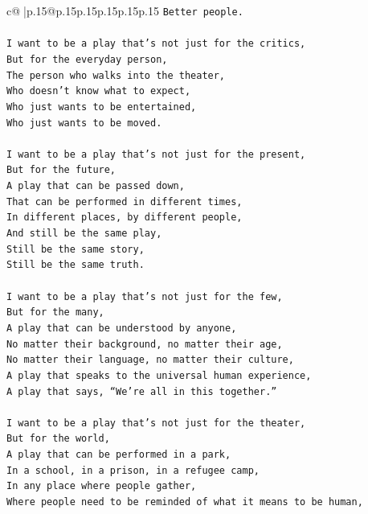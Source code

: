 \documentclass{article}
\begin{document}
{\begin{supertabular}{c@{$\;$}|p{.15\linewidth}@{}p{.15\linewidth}p{.15\linewidth}p{.15\linewidth}p{.15\linewidth}p{.15\linewidth}}
{{{\texttt{Better people.} \\
\\ 
\texttt{I want to be a play that’s not just for the critics,} \\
\texttt{But for the everyday person,} \\
\texttt{The person who walks into the theater,} \\
\texttt{Who doesn’t know what to expect,} \\
\texttt{Who just wants to be entertained,} \\
\texttt{Who just wants to be moved.} \\
\\ 
\texttt{I want to be a play that’s not just for the present,} \\
\texttt{But for the future,} \\
\texttt{A play that can be passed down,} \\
\texttt{That can be performed in different times,} \\
\texttt{In different places, by different people,} \\
\texttt{And still be the same play,} \\
\texttt{Still be the same story,} \\
\texttt{Still be the same truth.} \\
\\ 
\texttt{I want to be a play that’s not just for the few,} \\
\texttt{But for the many,} \\
\texttt{A play that can be understood by anyone,} \\
\texttt{No matter their background, no matter their age,} \\
\texttt{No matter their language, no matter their culture,} \\
\texttt{A play that speaks to the universal human experience,} \\
\texttt{A play that says, “We’re all in this together.”} \\
\\ 
\texttt{I want to be a play that’s not just for the theater,} \\
\texttt{But for the world,} \\
\texttt{A play that can be performed in a park,} \\
\texttt{In a school, in a prison, in a refugee camp,} \\
\texttt{In any place where people gather,} \\
\texttt{Where people need to be reminded of what it means to be human,} \\
}}}
\end{supertabular}}
\end{document}
